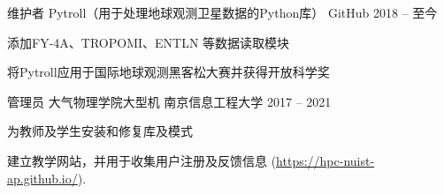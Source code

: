 

\begin{cventries}

  \cventry
    {维护者} %
    {Pytroll（用于处理地球观测卫星数据的Python库）} %
    {GitHub} %
    {2018 -- 至今} %
    {
      \begin{cvitems} %
        \item {添加FY-4A、TROPOMI、ENTLN 等数据读取模块}
        \item {将Pytroll应用于国际地球观测黑客松大赛并获得开放科学奖}
      \end{cvitems}
    }

  \cventry
    {管理员} %
    {大气物理学院大型机} %
    {南京信息工程大学} %
    {2017 -- 2021} %
    {
      \begin{cvitems} %
        \item {为教师及学生安装和修复库及模式}
        \item {建立教学网站，并用于收集用户注册及反馈信息 (\hypersetup{hidelinks}\url{https://hpc-nuist-ap.github.io/}).}
      \end{cvitems}
    }

\end{cventries}
